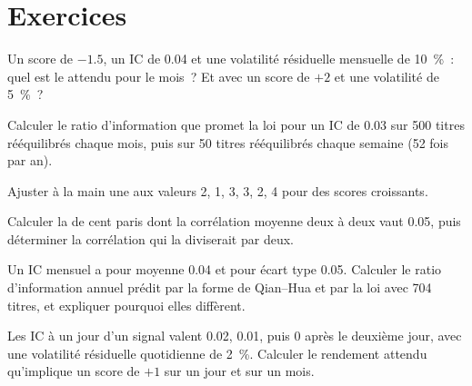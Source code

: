 \section{Exercices}

\begin{exercise}[$\star$]\label{exo:rs:from-signal-to-forecast:1}
Un score de $-1.5$, un IC de 0.04 et une volatilité résiduelle mensuelle de 10~\%~: quel est le  attendu pour le mois~? Et avec un score de
$+2$ et une volatilité de 5~\%~?
\end{exercise}

\begin{exercise}[$\star$]\label{exo:rs:from-signal-to-forecast:2}
Calculer le ratio d'information que promet la loi pour un IC de 0.03 sur 500 titres rééquilibrés chaque mois, puis sur 50 titres rééquilibrés chaque semaine (52 fois par an).
\end{exercise}

\begin{exercise}[$\star$]\label{exo:rs:from-signal-to-forecast:3}
Ajuster à la main une  aux valeurs 2, 1, 3, 3, 2, 4 pour des scores croissants.
\end{exercise}

\begin{exercise}[$\star\star$]\label{exo:rs:from-signal-to-forecast:4}
Calculer la  de cent paris dont la corrélation moyenne deux à deux vaut 0.05, puis déterminer la corrélation qui la diviserait par deux.
\end{exercise}

\begin{exercise}[$\star\star$]\label{exo:rs:from-signal-to-forecast:5}
Un IC mensuel a pour moyenne 0.04 et pour écart type 0.05. Calculer le ratio d'information annuel prédit par la forme de Qian--Hua et par la loi avec 704 titres, et
expliquer pourquoi elles diffèrent.
\end{exercise}

\begin{exercise}[$\star\star$]\label{exo:rs:from-signal-to-forecast:6}
Les IC à un jour d'un signal valent 0.02, 0.01, puis 0 après le deuxième jour, avec une volatilité résiduelle quotidienne de 2~\%. Calculer le rendement attendu qu'implique un score de $+1$
sur un jour et sur un mois.
\end{exercise}

